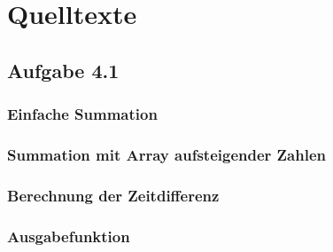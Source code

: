 \documentclass[a4paper,
12pt,
BCOR12mm,
]{scrartcl}
\begin{document}
\pagebreak
\section*{Quelltexte}
\subsection*{Aufgabe 4.1}
\subsubsection{Einfache Summation}
\label{src:sum}

\subsubsection{Summation mit Array aufsteigender Zahlen}
\label{src:ascend}


\subsubsection{Berechnung der Zeitdifferenz}
\label{src:messure}



\subsubsection{Ausgabefunktion}
\label{src:basic}


\end{document}
